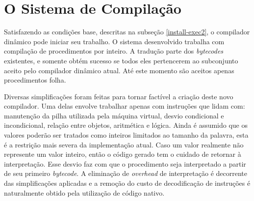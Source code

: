 \section{O Sistema de Compilação}
\label{sistemacompilacao}



Satisfazendo as condições base, descritas na subseção
\ref{install-exec2}, o compilador dinâmico pode iniciar seu trabalho.
O sistema desenvolvido trabalha com compilação de procedimentos por
inteiro. A tradução parte dos \textit{bytecodes} existentes,
e somente obtém sucesso se todos eles pertencerem ao subconjunto
aceito pelo compilador
dinâmico atual. Até este momento são aceitos apenas procedimentos folha.


Diversas simplificações foram feitas para tornar factível a criação
deste novo compilador. Uma delas envolve trabalhar apenas com
instruções que lidam com: manutenção da pilha utilizada pela máquina
virtual, desvio condicional e incondicional, relação entre objetos, aritmética e
lógica. Ainda é assumido que os valores poderão ser tratados como
inteiros limitados ao tamanho da palavra, esta é a restrição mais severa da
implementação atual. Caso um valor realmente não represente um valor
inteiro, então o código gerado tem o cuidado de retornar à
interpretação. Esse desvio faz com que o procedimento seja
interpretado a partir de seu primeiro \textit{bytecode}.
A eliminação de \textit{overhead} de interpretação é decorrente das
simplificações aplicadas e a remoção do custo de decodificação de
instruções é naturalmente obtido pela utilização de código nativo.

